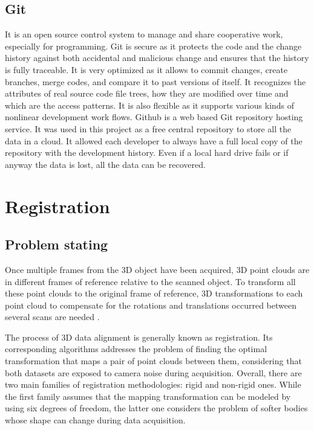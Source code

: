 \documentclass[a4paper]{report}
\begin{document}
\section{Git}
It is an open source control system to manage and share cooperative work, especially for programming. Git is secure as it protects the code and the change history against both accidental and malicious change and ensures that the history is fully traceable. It is very optimized as it allows to commit changes, create branches, merge codes, and compare it to past versions of itself. It recognizes the attributes of real source code file trees, how they are modified over time and which are the access patterns. It is also flexible as it supports various kinds of nonlinear development work flows. Github is a web based Git repository hosting service. It was used in this project as a free central repository to store all the data in a cloud. It allowed each developer to always have a full local copy of the repository with the development history. Even if a local hard drive fails or if anyway the data is lost, all the data can be recovered.

\chapter{Registration}
\section{Problem stating}
Once multiple frames from the 3D object have been acquired, 3D point clouds are in different frames of reference relative to the scanned object. To transform all these point clouds to the original frame of reference, 3D transformations to each point cloud to compensate for the rotations and translations occurred between several scans are needed \cite{proj1}.

The process of 3D data alignment is generally known as registration. Its corresponding
algorithms addresses the problem of finding the optimal transformation
that maps a pair of point clouds between them, considering that both datasets are
exposed to camera noise during acquisition. Overall, there are two main families of
registration methodologies: rigid and non-rigid ones. While the first family assumes
that the mapping transformation can be modeled by using six degrees of freedom,
the latter one considers the problem of softer bodies whose shape can change during
data acquisition. \cite{proj1}
\end{document}
